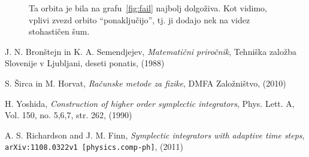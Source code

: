 \documentclass[12pt, a4paper]{article}
\begin{document}
\begin{figure}[H]\centering
	
	\caption{Ta orbita je bila na grafu~\ref{fig:fail} najbolj dolgo\v ziva. Kot vidimo, vplivi zvezd orbito
		"`ponaklju\v cijo"', tj. ji dodajo nek na videz stohasti\v cen \v sum.}
	\label{fig:unstable}
\end{figure}

\begin{thebibliography}{9}
		J. N. Bron\v stejn in K. A. Semendjejev,
		{\em Matemati\v cni priro\v cnik},
		Tehni\v ska zalo\v zba Slovenije v Ljubljani,
		deseti ponatis,
		(1988)

        S. \v Sirca in M. Horvat,
        {\em Ra\v cunske metode za fizike},
        DMFA Zalo\v zni\v stvo,
        (2010)

        H. Yoshida,
        \emph{Construction of higher order symplectic integrators},
        Phys. Lett. A,
        Vol. 150, no. 5,6,7, str. 262,
        (1990)

        A. S. Richardson and J. M. Finn,
        \emph{Symplectic integrators with adaptive time steps},
        {\tt arXiv:1108.0322v1 [physics.comp-ph]},
        (2011)
\end{thebibliography}
\end{document}
